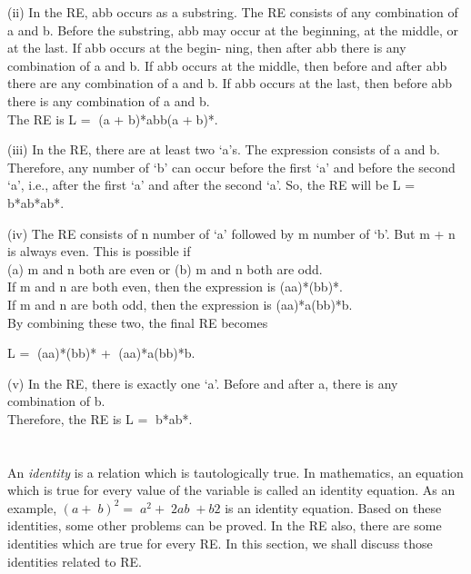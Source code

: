 \noindent\!\!\!\!\!\!\!\!\!\!(ii)	In the RE, abb occurs as a substring. The RE consists of any combination of a and b. Before the substring, abb may occur at the beginning, at the middle, or at the last. If abb occurs at the begin- ning, then after abb there is any combination of a and b. If abb occurs at the middle, then before and after abb there are any combination of a and b. If abb occurs at the last, then before abb there is any combination of a and b.\\
The RE is L = (a + b)*abb(a +b)*.

\noindent\!\!\!\!\!\!\!\!\!\!(iii)	In the RE, there are at least two ‘a’s. The expression consists of a and b. Therefore, any number of ‘b’
can occur before the ﬁrst ‘a’ and before the second ‘a’, i.e., after the ﬁrst ‘a’ and after the second ‘a’. So, the RE will be L = b*ab*ab*.

\noindent\!\!\!\!\!\!\!\!\!\!(iv)	The RE consists of n number of ‘a’ followed by m number of ‘b’. But m +  n is always even. This is possible if\\
(a)	m and n both are even or (b) m and n both are odd.\\
If m and n are both even, then the expression is (aa)*(bb)*.\\ If m and n are both odd, then the expression is (aa)*a(bb)*b.\\ By combining these two, the ﬁnal RE becomes

\begin{center}
L = (aa)*(bb)* + (aa)*a(bb)*b.
\end{center}
\noindent\!\!\!\!\!\!\!\!\!\!(v)	In the RE, there is exactly one ‘a’. Before and after a, there is any combination of b.\\ Therefore, the RE is L = b*ab*. 

\section{}
An \emph{identity} is a relation which is tautologically true. In mathematics, an equation which is true for every value of the variable is called an identity equation. As an example, $(a + b)^2 = a^2 + 2ab + b2$ is an identity equation. Based on these identities, some other problems can be proved. In the RE also, there are some identities which are true for every RE. In this section, we shall discuss those identities related to RE.

